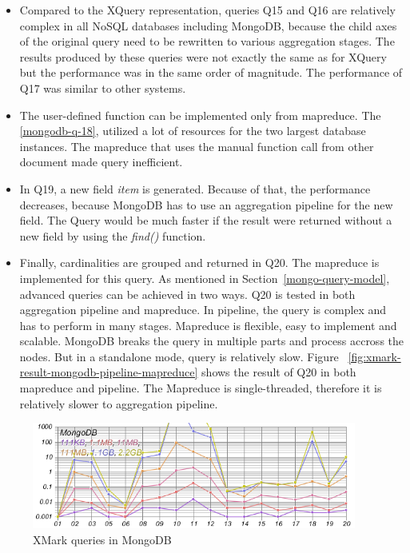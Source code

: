 \begin{itemize}
\item Compared to the XQuery representation, queries Q15 and Q16 are relatively complex in all NoSQL databases including MongoDB, because the child axes of the original query need to be rewritten to various aggregation stages. The results produced by these queries were not exactly the same as for XQuery but the performance was in the same order of magnitude. The performance of Q17 was similar to other systems.

\item  The user-defined function can be implemented only from mapreduce. The \ref{mongodb-q-18}, utilized a lot of resources for the two largest database instances. The mapreduce that uses the manual function call from other document made query inefficient. 

\item In Q19, a new field \textit{item} is generated. Because of that, the performance decreases, because  MongoDB has to use an aggregation pipeline for the new field. The Query would be much faster if the result were returned without a new field by using the \textit{find()} function.

\item Finally, cardinalities are grouped and returned in Q20. The mapreduce is implemented for this query. As mentioned in Section~\ref{mongo-query-model}, advanced queries can be achieved in two ways. Q20 is tested in both aggregation pipeline and mapreduce. In pipeline, the query is complex and has to perform in many stages. Mapreduce is flexible, easy to implement and scalable. MongoDB breaks the query in multiple parts and process accross the nodes. But in a standalone mode, query is relatively slow. Figure ~\ref{fig:xmark-result-mongodb-pipeline-mapreduce} shows the result of Q20 in both mapreduce and pipeline. The Mapreduce is single-threaded, therefore it is relatively slower to aggregation pipeline.
\end{itemize}
\begin{figure}[hbt]
	\centering
	\includegraphics[width=0.95\textwidth]{img/result/mongodb/mongodb-all-18-20}
	\caption{XMark queries in MongoDB}
	\label{fig:xmark-result-mongodb-all}
	
\end{figure}	
